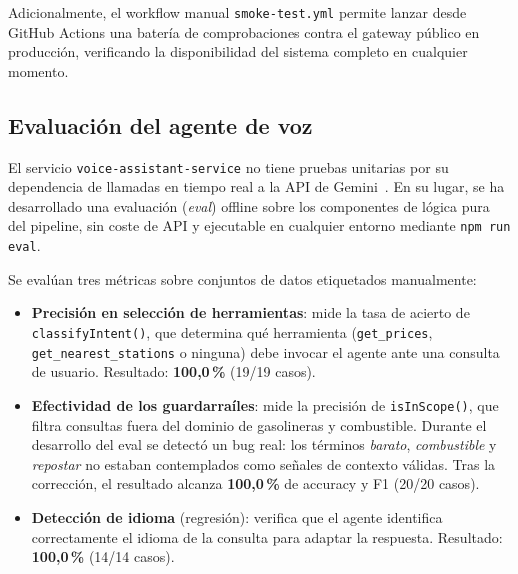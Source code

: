 Adicionalmente, el workflow manual \texttt{smoke-test.yml} permite lanzar desde GitHub Actions
una batería de comprobaciones contra el gateway público en producción, verificando la
disponibilidad del sistema completo en cualquier momento.

\subsection{Evaluación del agente de voz}
\label{sec:eval-agente-voz}

El servicio \texttt{voice-assistant-service} no tiene pruebas unitarias
por su dependencia de llamadas en tiempo real a la API de
Gemini~\cite{gemini_2_5}. En su lugar, se ha desarrollado una evaluación
(\textit{eval}) offline sobre los componentes de lógica pura del pipeline, sin
coste de API y ejecutable en cualquier entorno mediante \texttt{npm run eval}.

Se evalúan tres métricas sobre conjuntos de datos etiquetados manualmente:

\begin{itemize}
  \item \textbf{Precisión en selección de herramientas}: mide la tasa de acierto
        de \texttt{classifyIntent()}, que determina qué herramienta (\texttt{get\_prices},
        \texttt{get\_nearest\_stations} o ninguna) debe invocar el agente ante una
        consulta de usuario. Resultado: \textbf{100,0\,\%} (19/19 casos).

  \item \textbf{Efectividad de los guardarraíles}: mide la precisión de
        \texttt{isInScope()}, que filtra consultas fuera del dominio de gasolineras y
        combustible. Durante el desarrollo del eval se detectó un bug real: los
        términos \textit{barato}, \textit{combustible} y \textit{repostar} no estaban
        contemplados como señales de contexto válidas. Tras la corrección, el
        resultado alcanza \textbf{100,0\,\%} de accuracy y F1 (20/20 casos).

  \item \textbf{Detección de idioma} (regresión): verifica que el agente
        identifica correctamente el idioma de la consulta para adaptar la respuesta.
        Resultado: \textbf{100,0\,\%} (14/14 casos).
\end{itemize}

